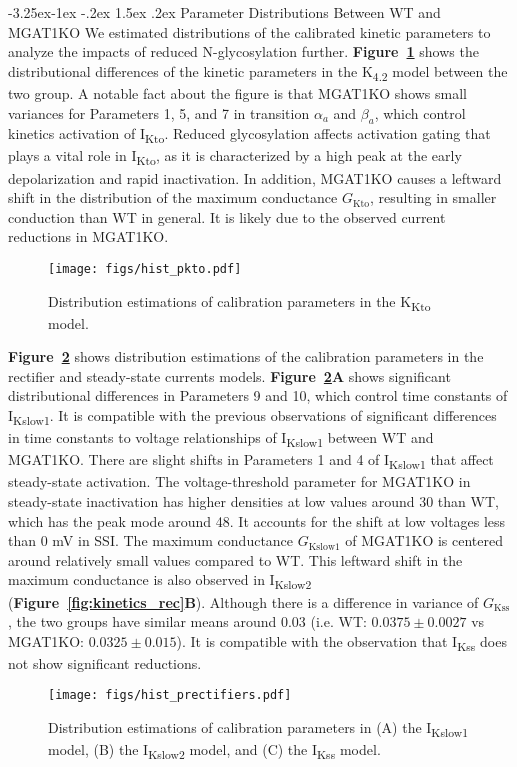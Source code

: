 \documentclass[11pt]{article}
\makeatletter
\renewcommand\subsection{\@startsection{subsection}{2}{\z@}%
                                     {-3.25ex\@plus -1ex \@minus -.2ex}%
                                     {1.5ex \@plus .2ex}%
                                     {\normalfont\fontfamily{phv}\fontsize{14}{17}\bfseries}}
\makeatother
\begin{document}
\subsection{Parameter Distributions Between WT and MGAT1KO} \label{s:results.distribution}
We estimated distributions of the calibrated kinetic parameters to analyze the impacts of reduced N-glycosylation further. \textbf{Figure~\ref{fig:hist_pkto}} shows the distributional differences of the kinetic parameters in the K\textsubscript{4.2} model between the two group. A notable fact about the figure is that MGAT1KO shows small variances for Parameters 1, 5, and 7 in transition $\alpha_{a}$ and $\beta_{a}$, which control kinetics activation of I\textsubscript{Kto}. Reduced glycosylation affects activation gating that plays a vital role in I\textsubscript{Kto}, as it is characterized by a high peak at the early depolarization and rapid inactivation. In addition, MGAT1KO causes a leftward shift in the distribution of the maximum conductance $G_{\mathrm{Kto}}$, resulting in smaller conduction than WT in general. It is likely due to the observed current reductions in MGAT1KO.
\begin{figure}[!ht]
    \centering
    \texttt{[image: figs/hist\_pkto.pdf]}
    \caption{Distribution estimations of calibration parameters in the K\textsubscript{Kto} model.}
    \label{fig:hist_pkto}
\end{figure}

\textbf{Figure~\ref{fig:hist_prectifiers}} shows distribution estimations of the calibration parameters in the rectifier and steady-state currents models. \textbf{Figure~\ref{fig:hist_prectifiers}A} shows significant distributional differences in Parameters 9 and 10, which control time constants of I\textsubscript{Kslow1}. It is compatible with the previous observations of significant differences in time constants to voltage relationships of I\textsubscript{Kslow1} between WT and MGAT1KO. There are slight shifts in Parameters 1 and 4 of I\textsubscript{Kslow1} that affect steady-state activation. The voltage-threshold parameter for MGAT1KO in steady-state inactivation has higher densities at low values around 30 than WT, which has the peak mode around 48. It accounts for the shift at low voltages less than 0 mV in SSI. The maximum conductance $G_{\mathrm{Kslow1}}$ of MGAT1KO is centered around relatively small values compared to WT. This leftward shift in the maximum conductance is also observed in I\textsubscript{Kslow2} (\textbf{Figure~\ref{fig:kinetics_rec}B}). Although there is a difference in variance of $G_{\mathrm{Kss}}$, the two groups have similar means around 0.03 (i.e. WT: $0.0375\pm0.0027$ vs MGAT1KO: $0.0325\pm0.015$). It is compatible with the observation that I\textsubscript{Kss} does not show significant reductions. 
\begin{figure}[!ht]
    \centering
    \texttt{[image: figs/hist\_prectifiers.pdf]}
    \caption{Distribution estimations of calibration parameters in (A) the I\textsubscript{Kslow1} model, (B) the I\textsubscript{Kslow2} model, and (C) the I\textsubscript{Kss} model.}
    \label{fig:hist_prectifiers}
\end{figure}
\end{document}
